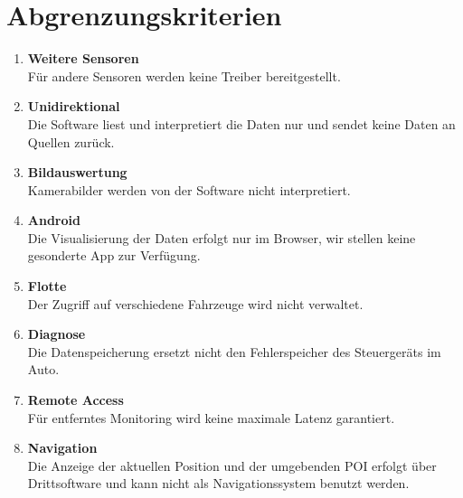\documentclass[pflichtenheft.tex]{subfiles}
\begin{document}
\renewcommand{\theenumi}{/AK\ifnum \value{enumi}<10 0\fi\arabic{enumi}0/}
\renewcommand{\labelenumi}{\theenumi}
\renewcommand{\theenumii}{\arabic{enumii}}
\renewcommand{\labelenumii}{/AK\ifnum \value{enumi}<10 0\fi\arabic{enumi}\arabic{enumii}/}

\section{Abgrenzungskriterien}

\begin{enumerate}
	\item{\textbf{Weitere Sensoren}} \\Für andere Sensoren werden keine Treiber bereitgestellt.

	\item{\textbf{Unidirektional}} \\Die Software liest und interpretiert die Daten nur und sendet keine Daten an Quellen zurück.

	\item{\textbf{Bildauswertung}} \\Kamerabilder werden von der Software nicht interpretiert.

	\item{\textbf{Android}} \\Die Visualisierung der Daten erfolgt nur im Browser, wir stellen keine gesonderte App zur Verfügung.

	\item{\textbf{Flotte}} \\Der Zugriff auf verschiedene Fahrzeuge wird nicht verwaltet.

	\item{\textbf{Diagnose}} \\Die Datenspeicherung ersetzt nicht den Fehlerspeicher des Steuergeräts im Auto.

	\item{\textbf{Remote Access}} \\Für entferntes Monitoring wird keine maximale Latenz garantiert.
	
	\item{\textbf{Navigation}}\\Die Anzeige der aktuellen Position und der umgebenden POI erfolgt über Drittsoftware und kann nicht als Navigationssystem benutzt werden.

\end{enumerate}
\end{document}
